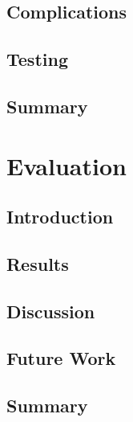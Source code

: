 \documentclass[a4paper,12pt,oneside]{book}
\begin{document}
	\section{Complications}
		
	\section{Testing}
		
	\section{Summary}
		
		
\chapter{Evaluation}
	\section{Introduction}
		
	\section{Results}
		
	\section{Discussion}
		
	\section{Future Work}
		
		\label{ch:futurework} 
	\section{Summary}
		
		


\renewcommand{\bibname}{Bibliography}

\end{document}
